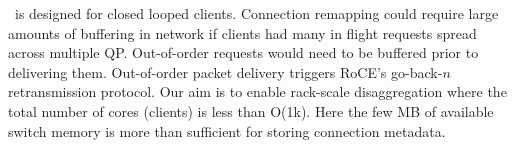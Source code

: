 \sword\ is designed for closed looped clients. Connection
remapping could require large amounts of buffering in
network if clients had many in flight requests spread across
multiple QP. Out-of-order requests would need to be buffered
prior to delivering them. Out-of-order packet delivery
triggers RoCE's go-back-$n$ retransmission protocol.
Our aim is to enable rack-scale disaggregation where the
total number of cores (clients) is less than O(1k). Here
the few MB of available switch memory is more than
sufficient for storing connection metadata.


%

